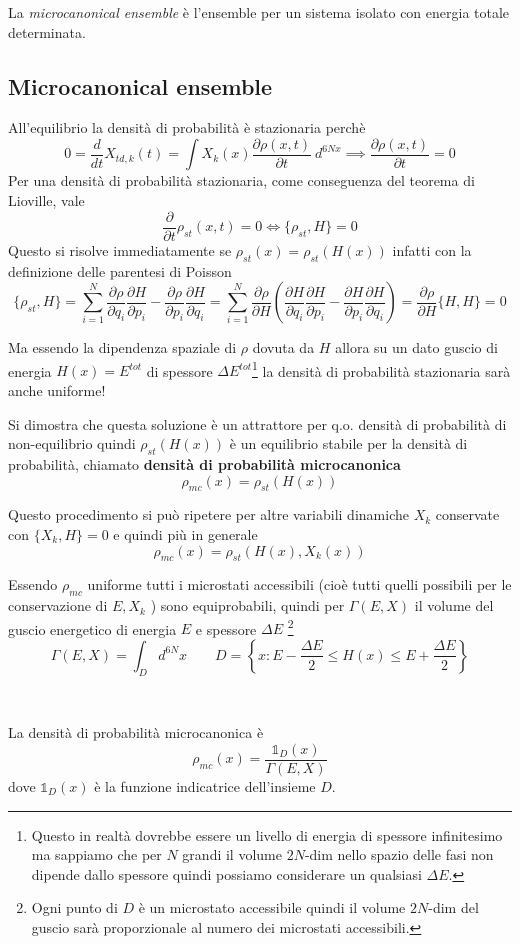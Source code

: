 \documentclass[11pt,a4paper,twoside]{book}
\newenvironment{importante}[1][~]{ 
  \begin{center}\begin{tcolorbox}[enhanced,
  before skip=2mm,after skip=3mm,
  boxrule=0.4pt,left=5mm,right=2mm,top=1mm,bottom=1mm,
  colback=white,
  colframe=white!20!black,
  sharp corners,arc=3mm,
  underlay={
  	\path[fill=red!50!black,draw=none] (interior.south west) rectangle 			
  	node[white]{\Huge\bfseries !} ([xshift=4mm]interior.north west);
  },
  drop fuzzy shadow]
 {\ifx\empty#1\relax\else\mdseries\bfseries#1\\\fi}
 \normalsize 
  }{
	\end{tcolorbox}\end{center}
}
\numberwithin{equation}{section} %
\begin{document}
La \textit{microcanonical ensemble} è l'ensemble per un sistema isolato con energia totale determinata.

\subsection{Microcanonical ensemble}

All'equilibrio la densità di probabilità è stazionaria perchè
\[
0=\dfrac{d}{dt}X_{td,k}(t)=\int X_k(x)\dfrac{\partial\rho(x,t)}{\partial t}\>d^{6Nx}\implies \dfrac{\partial\rho(x,t)}{\partial t}=0
\]
Per una densità di probabilità stazionaria, come conseguenza del teorema di Lioville, vale 
\[
\dfrac{\partial}{\partial t} \rho_{st}(x,t)=0 \iff \{\rho_{st},H\}=0
\]
Questo si risolve immediatamente se $\rho_{st}(x)=\rho_{st}(H(x))$ infatti con la definizione delle parentesi di Poisson
\[
\{\rho_{st},H\}=\sum_{i=1}^N \dfrac{\partial \rho}{\partial q_i}\dfrac{\partial H}{\partial p_i} - \dfrac{\partial \rho}{\partial p_i}\dfrac{\partial H}{\partial q_i} = 
\sum_{i=1}^N \dfrac{\partial \rho}{\partial H}\left( 
\dfrac{\partial H}{\partial q_i} \dfrac{\partial H}{\partial p_i} - \dfrac{\partial H}{\partial p_i}\dfrac{\partial H}{\partial q_i} \right) = \dfrac{\partial \rho}{\partial H}\{H,H\}=0
\]

Ma essendo la dipendenza spaziale di $\rho$ dovuta da $H$ allora su un dato guscio di energia $H(x)=E^{tot}$ di spessore $\Delta E^{tot}$\footnote{Questo in realtà dovrebbe essere un livello di energia di spessore infinitesimo ma sappiamo che per $N$ grandi il volume $2N$-dim nello spazio delle fasi non dipende dallo spessore quindi possiamo considerare un qualsiasi $\Delta E$.} la densità di probabilità stazionaria sarà anche uniforme!

Si dimostra che questa soluzione è un attrattore per q.o. densità di probabilità di non-equilibrio 	quindi $\rho_{st}(H(x))$ è un equilibrio stabile per la densità di probabilità, chiamato \textbf{densità di probabilità microcanonica}
\begin{equation}
\rho_{mc}(x)=\rho_{st}(H(x))
\end{equation}

Questo procedimento si può ripetere per altre variabili dinamiche $X_k$ conservate con $\{X_k,H\}=0$ e quindi più in generale
\[
\rho_{mc}(x)=\rho_{st}(H(x),X_k(x))
\]

Essendo $\rho_{mc}$ uniforme tutti i microstati accessibili (cioè tutti quelli possibili per le conservazione di $E,X_k$ ) sono equiprobabili, quindi per $\Gamma(E,X)$ il volume del guscio energetico di energia $E$ e spessore $\Delta E$ \footnote{Ogni punto di $D$ è un microstato accessibile quindi il volume $2N$-dim del guscio sarà proporzionale al numero dei microstati accessibili.}
\[
\Gamma(E,X)=\int_{D} d^{6N}x \qquad D=\left\{x:E-\dfrac{\Delta E}{2}\leq H(x)\leq E+\dfrac{\Delta E}{2}\right\}
\] 
\begin{importante}
La densità di probabilità microcanonica è
\begin{equation}
\rho_{mc}(x)=\dfrac{\mathbb{1}_D(x)}{\Gamma(E,X)}
\end{equation}
dove $\mathbb{1}_D(x)$ è la funzione indicatrice dell'insieme $D$.
\end{importante}
\end{document}
